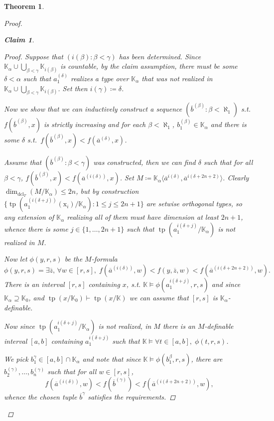 \documentclass{amsart}
\newtheorem{theorem}{Theorem}
\newtheorem{claim}{Claim}[theorem]
\theoremstyle{remark}
\theoremstyle{definition}
\theoremstyle{plain}
\newcommand{\bK}{\mathbb K}
\DeclareMathOperator{\tp}{\mathrm{tp}}
\DeclareMathOperator{\dcl}{\mathrm{dcl}}
\newcommand{\var}[1]{\mathrm{#1}}
\theoremstyle{plain}
\begin{document}
\begin{theorem}
\begin{proof}
\begin{claim}
\begin{proof}
                Suppose that $(i(\beta): \beta<\gamma)$ has been determined. Since $\bK_\alpha\cup \bigcup_{\beta<\gamma}\bK_{i(\beta)}$ is countable, by the claim assumption, there must be some $\delta<\alpha$ such that $a_1^{(\delta)}$ realizes a type over $\bK_\alpha$ that was not realized in $\bK_\alpha \cup \bigcup_{\beta<\gamma}\bK_{i(\beta)}$. Set then $i(\gamma)\coloneq\delta$.

                Now we show that we can inductively construct a sequence $(\overline{b}^{(\beta)}:\beta< \aleph_1)$ s.t.\ $f(\overline{b}^{(\beta)}, x)$ is strictly increasing and for each $\beta<\aleph_1$, $b_1^{(\beta)} \in \bK_\alpha$ and there is some $\delta$ s.t.\ $f(\overline{b}^{(\beta)}, x)<f(\overline{a}^{(\delta)},x)$.

                Assume that $(\overline{b}^{(\beta)}: \beta<\gamma)$ was constructed, then we can find $\delta$ such that for all $\beta<\gamma$, $f(\overline{b}^{(\beta)}, x)<f(\overline{a}^{(i(\delta))},x)$. Set $M\coloneqq \bK_\alpha \langle \overline{a}^{i(\delta)}, \overline{a}^{i(\delta+2n+2)}\rangle$. Clearly $\dim_{\dcl_T}(M/\bK_\alpha)\le 2n$, but by construction $\{\tp(a_1^{(i(\delta+j))}(\var{x}_i)/\bK_\alpha): 1 \le j \le 2n+1\}$ are setwise orthogonal types, so any extension of $\bK_\alpha$ realizing all of them must have dimension at least $2n+1$, whence there is some $j \in \{1, \ldots, 2n +1\}$ such that $\tp(a_1^{i(\delta+j)}/\bK_\alpha)$ is not realized in $M$.

                Now let $\phi(y,r,s)$ be the $M$-formula
                \[\phi(y,r,s) = \exists \overline{z},\, \forall w \in [r,s],\; f(\overline{a}^{(i(\delta))}, w)<f(y, \overline{z},w)<f(\overline{a}^{(i(\delta+2n+2))},w).\]
                There is an interval $[r,s]$ containing $x$, s.t. $\bK \models \phi(a_1^{i(\delta+j)}, r,s)$ and since $\bK_\alpha\supseteq \bK_0$, and $\tp(x/\bK_0)\vdash \tp(x/\bK)$ we can assume that $[r,s]$ is $\bK_\alpha$-definable.

                Now since $\tp(a_1^{i(\delta+j)}/\bK_\alpha)$ is not realized, in $M$ there is an $M$-definable interval $[a,b]$ containing $a_1^{i(\delta+j)}$ such that $\bK\models \forall t \in [a,b],\; \phi(t,r,s)$.

                We pick $b_1^\gamma \in [a,b] \cap \bK_\alpha$ and note that since $\bK\models \phi(b_1^{\beta},r,s)$, there are $b_2^{(\gamma)}, \ldots, b_{n}^{(\gamma)}$ such that for all $w \in [r,s]$,
                \[f(\overline{a}^{(i(\delta))},w)<f(\overline{b}^{(\gamma)})<f(\overline{a}^{(i(\delta+2n+2))},w),\]
                whence the chosen tuple $\overline{b}^{\gamma}$ satisfies the requirements.


\end{proof}
\end{claim}
\end{proof}
\end{theorem}
\end{document}
